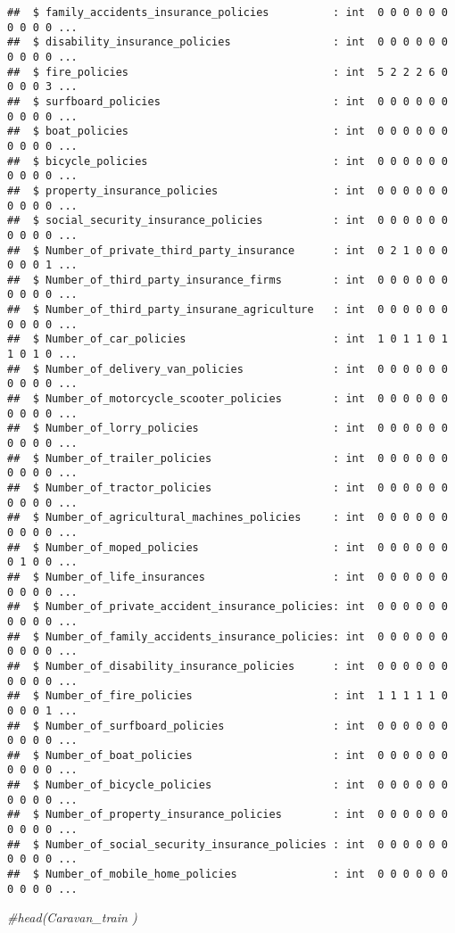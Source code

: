 \documentclass[]{article}
\newenvironment{Shaded}{\begin{snugshade}}{\end{snugshade}}
\newcommand{\CommentTok}[1]{\textcolor[rgb]{0.56,0.35,0.01}{\textit{#1}}}
\begin{document}
\begin{verbatim}
##  $ family_accidents_insurance_policies          : int  0 0 0 0 0 0 0 0 0 0 ...
##  $ disability_insurance_policies                : int  0 0 0 0 0 0 0 0 0 0 ...
##  $ fire_policies                                : int  5 2 2 2 6 0 0 0 0 3 ...
##  $ surfboard_policies                           : int  0 0 0 0 0 0 0 0 0 0 ...
##  $ boat_policies                                : int  0 0 0 0 0 0 0 0 0 0 ...
##  $ bicycle_policies                             : int  0 0 0 0 0 0 0 0 0 0 ...
##  $ property_insurance_policies                  : int  0 0 0 0 0 0 0 0 0 0 ...
##  $ social_security_insurance_policies           : int  0 0 0 0 0 0 0 0 0 0 ...
##  $ Number_of_private_third_party_insurance      : int  0 2 1 0 0 0 0 0 0 1 ...
##  $ Number_of_third_party_insurance_firms        : int  0 0 0 0 0 0 0 0 0 0 ...
##  $ Number_of_third_party_insurane_agriculture   : int  0 0 0 0 0 0 0 0 0 0 ...
##  $ Number_of_car_policies                       : int  1 0 1 1 0 1 1 0 1 0 ...
##  $ Number_of_delivery_van_policies              : int  0 0 0 0 0 0 0 0 0 0 ...
##  $ Number_of_motorcycle_scooter_policies        : int  0 0 0 0 0 0 0 0 0 0 ...
##  $ Number_of_lorry_policies                     : int  0 0 0 0 0 0 0 0 0 0 ...
##  $ Number_of_trailer_policies                   : int  0 0 0 0 0 0 0 0 0 0 ...
##  $ Number_of_tractor_policies                   : int  0 0 0 0 0 0 0 0 0 0 ...
##  $ Number_of_agricultural_machines_policies     : int  0 0 0 0 0 0 0 0 0 0 ...
##  $ Number_of_moped_policies                     : int  0 0 0 0 0 0 0 1 0 0 ...
##  $ Number_of_life_insurances                    : int  0 0 0 0 0 0 0 0 0 0 ...
##  $ Number_of_private_accident_insurance_policies: int  0 0 0 0 0 0 0 0 0 0 ...
##  $ Number_of_family_accidents_insurance_policies: int  0 0 0 0 0 0 0 0 0 0 ...
##  $ Number_of_disability_insurance_policies      : int  0 0 0 0 0 0 0 0 0 0 ...
##  $ Number_of_fire_policies                      : int  1 1 1 1 1 0 0 0 0 1 ...
##  $ Number_of_surfboard_policies                 : int  0 0 0 0 0 0 0 0 0 0 ...
##  $ Number_of_boat_policies                      : int  0 0 0 0 0 0 0 0 0 0 ...
##  $ Number_of_bicycle_policies                   : int  0 0 0 0 0 0 0 0 0 0 ...
##  $ Number_of_property_insurance_policies        : int  0 0 0 0 0 0 0 0 0 0 ...
##  $ Number_of_social_security_insurance_policies : int  0 0 0 0 0 0 0 0 0 0 ...
##  $ Number_of_mobile_home_policies               : int  0 0 0 0 0 0 0 0 0 0 ...
\end{verbatim}

\begin{Shaded}
\begin{Highlighting}[]
\CommentTok{#head(Caravan_train )}
\end{Highlighting}
\end{Shaded}
\end{document}
